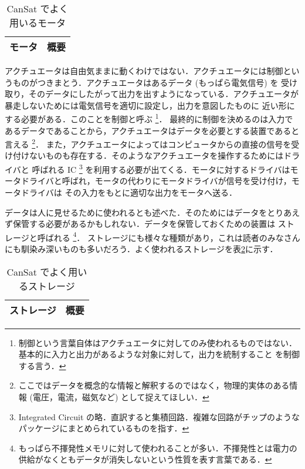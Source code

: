 \documentclass[dvipdfmx]{jsbook}
\begin{document}
  \begin{table}[htbp]
    \centering
    \caption{CanSat でよく用いるモータ}
    \begin{tabular}{c|r} \hline
      モータ & 概要 \\ \hline
    \end{tabular}
    \label{tab:2.2.3-motors}
  \end{table}

  アクチュエータは自由気ままに動くわけではない．アクチュエータには制御というものがつきまとう．アクチュエータはあるデータ (もっぱら電気信号) を
  受け取り，そのデータにしたがって出力を出すようになっている．アクチュエータが暴走しないためには電気信号を適切に設定し，出力を意図したものに
  近い形にする必要がある．このことを制御と呼ぶ
  \footnote{制御という言葉自体はアクチュエータに対してのみ使われるものではない．基本的に入力と出力があるような対象に対して，出力を統制すること
  を制御する言う．}．
  最終的に制御を決めるのは入力であるデータであることから，アクチュエータはデータを必要とする装置であると言える
  \footnote{ここではデータを概念的な情報と解釈するのではなく，物理的実体のある情報 (電圧，電流，磁気など) として捉えてほしい．}．
  また，アクチュエータによってはコンピュータからの直接の信号を受け付けないものも存在する．そのようなアクチュエータを操作するためにはドライバと
  呼ばれる IC
  \footnote{Integrated Circuit の略．直訳すると集積回路．複雑な回路がチップのようなパッケージにまとめられているものを指す．}
   を利用する必要が出てくる．モータに対するドライバはモータドライバと呼ばれ，モータの代わりにモータドライバが信号を受け付け，モータドライバは
  その入力をもとに適切な出力をモータへ送る．

  データは人に見せるために使われるとも述べた．そのためにはデータをとりあえず保管する必要があるかもしれない．データを保管しておくための装置は
  ストレージと呼ばれる
  \footnote{もっぱら不揮発性メモリに対して使われることが多い．不揮発性とは電力の供給がなくともデータが消失しないという性質を表す言葉である．}．
  ストレージにも様々な種類があり，これは読者のみなさんにも馴染み深いものも多いだろう．よく使われるストレージを表\ref{tab:2.2.3-storage}に示す．

  \begin{table}[htbp]
    \centering
    \caption{CanSat でよく用いるストレージ}
    \begin{tabular}{c|r} \hline
      ストレージ & 概要 \\ \hline
    \end{tabular}
    \label{tab:2.2.3-storage}
  \end{table}
\end{document}
